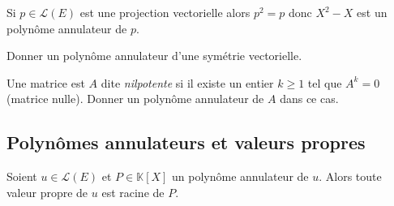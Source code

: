 \documentclass[a4paper,10pt]{report}
\begin{document}
\begin{ex} Si $p \in \mathcal{L}(E)$ est une projection vectorielle alors $p^2=p$ donc $X^2-X$ est un polynôme annulateur de $p$.
\end{ex}

\begin{exa} Donner un polynôme annulateur d'une symétrie vectorielle.
\end{exa}

\begin{exa} Une matrice est $A$ dite \textit{nilpotente} si il existe un entier $k \geq 1$ tel que $A^k= 0$ (matrice nulle). Donner un polynôme annulateur de $A$ dans ce cas.
\end{exa}

\subsection{Polynômes annulateurs et valeurs propres}

\begin{prop} Soient $u \in \mathcal{L}(E)$ et $P \in \mathbb{K}[X]$ un polynôme annulateur de $u$. Alors toute valeur propre de $u$ est racine de $P$. 
\end{prop}

\begin{preuve} 

\vspace{7cm}
 \end{preuve}
 
\end{document}
